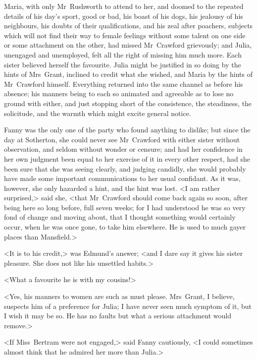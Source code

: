 Maria, with only Mr~Rushworth to attend to her, and doomed to the repeated details of his day's sport, good or bad, his boast of his dogs, his jealousy of his neighbours, his doubts of their qualifications, and his zeal after poachers, subjects which will not find their way to female feelings without some talent on one side or some attachment on the other, had missed Mr~Crawford grievously; and Julia, unengaged and unemployed, felt all the right of missing him much more. Each sister believed herself the favourite. Julia might be justified in so doing by the hints of Mrs~Grant, inclined to credit what she wished, and Maria by the hints of Mr~Crawford himself. Everything returned into the same channel as before his absence; his manners being to each so animated and agreeable as to lose no ground with either, and just stopping short of the consistence, the steadiness, the solicitude, and the warmth which might excite general notice.

Fanny was the only one of the party who found anything to dislike; but since the day at Sotherton, she could never see Mr~Crawford with either sister without observation, and seldom without wonder or censure; and had her confidence in her own judgment been equal to her exercise of it in every other respect, had she been sure that she was seeing clearly, and judging candidly, she would probably have made some important communications to her usual confidant. As it was, however, she only hazarded a hint, and the hint was lost. <I am rather surprised,> said she, <that Mr~Crawford should come back again so soon, after being here so long before, full seven weeks; for I had understood he was so very fond of change and moving about, that I thought something would certainly occur, when he was once gone, to take him elsewhere. He is used to much gayer places than Mansfield.>

<It is to his credit,> was Edmund's answer; <and I dare say it gives his sister pleasure. She does not like his unsettled habits.>

<What a favourite he is with my cousins!>

<Yes, his manners to women are such as must please. Mrs~Grant, I believe, suspects him of a preference for Julia; I have never seen much symptom of it, but I wish it may be so. He has no faults but what a serious attachment would remove.>

<If Miss~Bertram were not engaged,> said Fanny cautiously, <I could sometimes almost think that he admired her more than Julia.>


